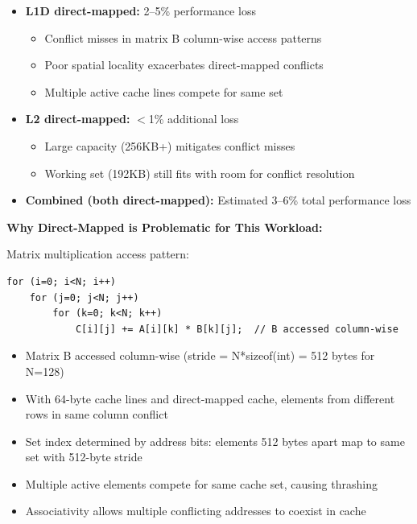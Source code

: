 \documentclass[11pt,a4paper]{article}
\begin{document}
\begin{itemize}[noitemsep]
    \item \textbf{L1D direct-mapped:} 2--5\% performance loss
    \begin{itemize}[noitemsep]
        \item Conflict misses in matrix B column-wise access patterns
        \item Poor spatial locality exacerbates direct-mapped conflicts
        \item Multiple active cache lines compete for same set
    \end{itemize}

    \item \textbf{L2 direct-mapped:} $<$1\% additional loss
    \begin{itemize}[noitemsep]
        \item Large capacity (256KB+) mitigates conflict misses
        \item Working set (192KB) still fits with room for conflict resolution
    \end{itemize}

    \item \textbf{Combined (both direct-mapped):} Estimated 3--6\% total performance loss
\end{itemize}

\textbf{Why Direct-Mapped is Problematic for This Workload:}

Matrix multiplication access pattern:
\begin{verbatim}
for (i=0; i<N; i++)
    for (j=0; j<N; j++)
        for (k=0; k<N; k++)
            C[i][j] += A[i][k] * B[k][j];  // B accessed column-wise
\end{verbatim}

\begin{itemize}[noitemsep]
    \item Matrix B accessed column-wise (stride = N*sizeof(int) = 512 bytes for N=128)
    \item With 64-byte cache lines and direct-mapped cache, elements from different rows in same column conflict
    \item Set index determined by address bits: elements 512 bytes apart map to same set with 512-byte stride
    \item Multiple active elements compete for same cache set, causing thrashing
    \item Associativity allows multiple conflicting addresses to coexist in cache
\end{itemize}
\end{document}
